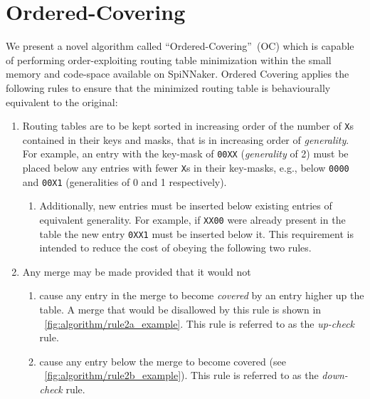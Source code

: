 \documentclass[conference]{IEEEtran}
\newcommand{\mytt}[1]{\texttt{\footnotesize#1}}
\begin{document}
\section{Ordered-Covering}

We present a novel algorithm called ``Ordered-Covering''~(OC) which is capable of performing order-exploiting routing table minimization within the small memory and code-space available on SpiNNaker.
Ordered Covering applies the following rules to ensure that the minimized routing table is behaviourally equivalent to the original:

  \begin{enumerate}[\IEEEsetlabelwidth{2)}]
    \item Routing tables are to be kept sorted in increasing order of the number of \mytt{X}s contained in their keys and masks, that is in increasing order of \textit{generality}.
      For example, an entry with the key-mask of \mytt{00XX} (\textit{generality} of 2) must be placed below any entries with fewer \mytt{X}s in their key-masks, e.g., below \mytt{0000} and \mytt{00X1} (generalities of 0 and 1 respectively).
      \begin{enumerate}[\IEEEsetlabelwidth{a)}]
        \item Additionally, new entries must be inserted below existing entries of equivalent generality.
              For example, if \mytt{XX00} were already present in the table the new entry \mytt{0XX1} must be inserted below it.
              This requirement is intended to reduce the cost of obeying the following two rules.
      \end{enumerate}
    \item Any merge may be made provided that it would not
      \begin{enumerate}[\IEEEsetlabelwidth{b)}]
        \item cause any entry in the merge to become \textit{covered} by an entry higher up the table.
              A merge that would be disallowed by this rule is shown in \figurename~\ref{fig:algorithm/rule2a_example}.
              This rule is referred to as the \textit{up-check} rule.
        \item cause any entry below the merge to become covered (see \figurename~\ref{fig:algorithm/rule2b_example}).
              This rule is referred to as the \textit{down-check} rule.
      \end{enumerate}
  \end{enumerate}
\end{document}

